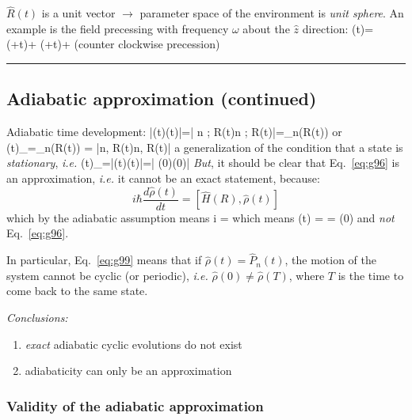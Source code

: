 \documentclass[12pt]{article}
\begin{document}
$\hat{R}(t)$ is a unit vector $\rightarrow$ parameter space of the
environment is \emph{unit sphere}.
An example is the field precessing with
frequency $\omega$ about the $\hat{z}$ direction:
\be
{}(t)= \sin \theta \cos (\phi+\omega t)+  \sin \theta \sin (\phi+\omega t)+ \cos \theta
\label{eq:g81}
\ee
(counter clockwise precession)

\rule{\textwidth}{1pt}


\setcounter{subsection}{2}
\subsection{Adiabatic approximation (continued)}
\setcounter{equation}{95}

Adiabatic time development:
\be
|\psi(t)\rangle\langle\psi(t)|=| n ; R(t)\rangle\langle n ; R(t)|=_{n}(R(t))
\label{eq:g96}
\ee
or
\be
\hat{\rho}(t)_{}=_{n}(R(t)) = |n, R(t)\rangle\langle n, R(t)|
\ee
a generalization of the condition that
a state is \emph{stationary}, \textit{i.e.}
\be
\hat{\rho}(t)_{}=|\psi(t)\rangle\langle\psi(t)|=| \psi(0)\rangle\langle\psi(0)|
\ee
\emph{But}, it should be clear that Eq.~\eqref{eq:g96} is an
approximation, \textit{i.e.} it cannot be an exact
statement, because:
\[
i \hbar \frac{d \hat{\rho}(t)}{d t}=[\hat{H}(R), \hat{\rho}(t)]
\]
which by the adiabatic assumption means
\be
i \hbar {}=
\label{eq:g99}
\ee
which means
\be
\hat{\rho}(t) =  = \hat{\rho}(0)
\ee
and \emph{not} Eq.~\eqref{eq:g96}.

In particular, Eq.~\eqref{eq:g99} means that if
$\hat{\rho}(t)=\hat{P}_{n}(t)$, the motion of the system cannot
be cyclic (or periodic), \textit{i.e.} $\hat{\rho}(0) \neq \hat{\rho}(T)$, where
$T$ is the time to come back to the same state.

\emph{Conclusions:}
\begin{enumerate}
\item \emph{exact} adiabatic cyclic evolutions do not exist
\item adiabaticity can only be an approximation
\end{enumerate}

\setcounter{subsubsection}{2}
\subsubsection{Validity of the adiabatic approximation}
\end{document}
